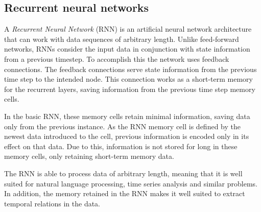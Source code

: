 \subsection{Recurrent neural networks}

A \textit{Recurrent Neural Network} (RNN) is an artificial neural network architecture that can work with data sequences of arbitrary length.
Unlike feed-forward networks, RNNs consider the input data in conjunction with state information from a previous timestep.
To accomplish this the network uses feedback connections.
The feedback connections serve state information from the previous time step to the intended node.
This connection works as a short-term memory for the recurrent layers, saving information from the previous time step memory cells.

In the basic RNN, these memory cells retain minimal information, saving data only from the previous instance.
As the RNN memory cell is defined by the newest data introduced to the cell, previous information is encoded only in its effect on that data.
Due to this, information is not stored for long in these memory cells, only retaining short-term memory data.



The RNN is able to process data of arbitrary length, meaning that it is well suited for natural language processing, time series analysis and similar problems.
In addition, the memory retained in the RNN makes it well suited to extract temporal relations in the data.

